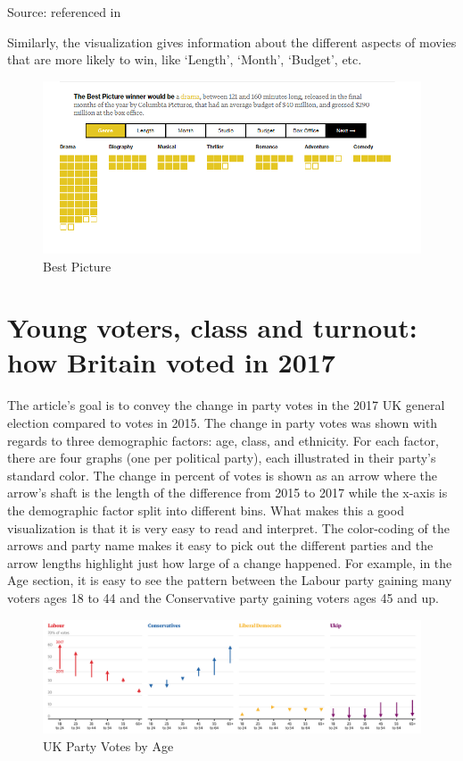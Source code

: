 \documentclass[]{book}
\theoremstyle{definition}
\theoremstyle{definition}
\theoremstyle{definition}
\theoremstyle{remark}
\begin{document}
Source: \citep{oscars_sowhite_chart} referenced in \citep{int_viz_2}

Similarly, the visualization gives information about the different
aspects of movies that are more likely to win, like `Length', `Month',
`Budget', etc.

\begin{figure}
\centering
\includegraphics{images/img_oscars_pic.PNG}
\caption{Best Picture}
\end{figure}

\section{Young voters, class and turnout: how Britain voted in
2017}\label{young-voters-class-and-turnout-how-britain-voted-in-2017}

\citep{UKvotes2017} The article's goal is to convey the change in party
votes in the 2017 UK general election compared to votes in 2015. The
change in party votes was shown with regards to three demographic
factors: age, class, and ethnicity. For each factor, there are four
graphs (one per political party), each illustrated in their party's
standard color. The change in percent of votes is shown as an arrow
where the arrow's shaft is the length of the difference from 2015 to
2017 while the x-axis is the demographic factor split into different
bins. What makes this a good visualization is that it is very easy to
read and interpret. The color-coding of the arrows and party name makes
it easy to pick out the different parties and the arrow lengths
highlight just how large of a change happened. For example, in the Age
section, it is easy to see the pattern between the Labour party gaining
many voters ages 18 to 44 and the Conservative party gaining voters ages
45 and up.

\begin{figure}
\centering
\includegraphics{images/Party_Votes_by_Age.png}
\caption{UK Party Votes by Age}
\end{figure}
\end{document}
